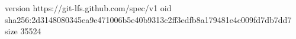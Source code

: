 version https://git-lfs.github.com/spec/v1
oid sha256:2d3148080345ea9e471006b5e40b9313c2ff3edfb8a179481e4c009fd7db7dd7
size 35524
